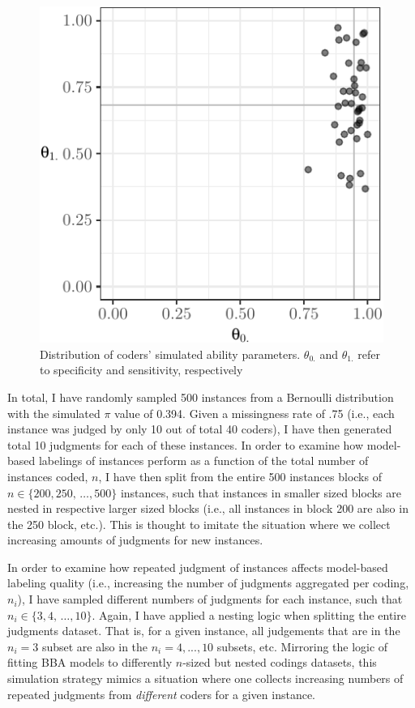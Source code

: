 \documentclass[12pt,]{article}
\begin{document}
\begin{figure}[H]

{\centering \includegraphics{licht_2019_evaluating_crowdsourced_elite_critique_codings_files/figure-latex/plot_sim_thetas-1} 

}

\caption{Distribution of coders' simulated ability parameters. $\theta_{0.}$ and $\theta_{1.}$ refer to specificity and sensitivity, respectively}\label{fig:plot_sim_thetas}
\end{figure}

In total, I have randomly sampled 500 instances from a Bernoulli
distribution with the simulated \(\pi\) value of 0.394. Given a
missingness rate of .75 (i.e., each instance was judged by only 10 out
of total 40 coders), I have then generated total 10 judgments for each
of these instances. In order to examine how model-based labelings of
instances perform as a function of the total number of instances coded,
\(n\), I have then split from the entire 500 instances blocks of
\(n \in \{200, 250,\,\ldots, 500\}\) instances, such that instances in
smaller sized blocks are nested in respective larger sized blocks (i.e.,
all instances in block 200 are also in the 250 block, etc.). This is
thought to imitate the situation where we collect increasing amounts of
judgments for new instances.

In order to examine how repeated judgment of instances affects
model-based labeling quality (i.e., increasing the number of judgments
aggregated per coding, \(n_i\)), I have sampled different numbers of
judgments for each instance, such that
\(n_i \in \{3, 4,\,\ldots, 10\}\). Again, I have applied a nesting logic
when splitting the entire judgments dataset. That is, for a given
instance, all judgements that are in the \(n_i = 3\) subset are also in
the \(n_i = 4, ..., 10\) subsets, etc. Mirroring the logic of fitting
BBA models to differently \(n\)-sized but nested codings datasets, this
simulation strategy mimics a situation where one collects increasing
numbers of repeated judgments from \emph{different} coders for a given
instance.
\end{document}
